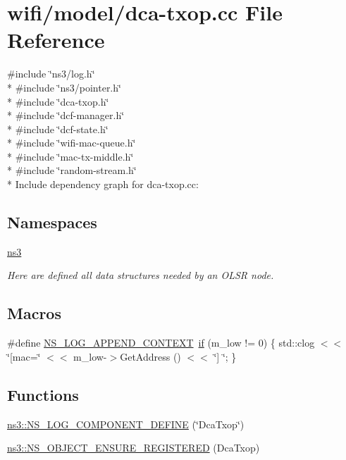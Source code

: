 \hypertarget{dca-txop_8cc}{}\section{wifi/model/dca-\/txop.cc File Reference}
\label{dca-txop_8cc}
{\ttfamily \#include \char`\"{}ns3/log.\+h\char`\"{}}\\*
{\ttfamily \#include \char`\"{}ns3/pointer.\+h\char`\"{}}\\*
{\ttfamily \#include \char`\"{}dca-\/txop.\+h\char`\"{}}\\*
{\ttfamily \#include \char`\"{}dcf-\/manager.\+h\char`\"{}}\\*
{\ttfamily \#include \char`\"{}dcf-\/state.\+h\char`\"{}}\\*
{\ttfamily \#include \char`\"{}wifi-\/mac-\/queue.\+h\char`\"{}}\\*
{\ttfamily \#include \char`\"{}mac-\/tx-\/middle.\+h\char`\"{}}\\*
{\ttfamily \#include \char`\"{}random-\/stream.\+h\char`\"{}}\\*
Include dependency graph for dca-\/txop.cc\+:
\subsection*{Namespaces}
\begin{DoxyCompactItemize}
\item 
 \hyperlink{namespacens3}{ns3}
\begin{DoxyCompactList}\small\item\em Here are defined all data structures needed by an O\+L\+SR node. \end{DoxyCompactList}\end{DoxyCompactItemize}
\subsection*{Macros}
\begin{DoxyCompactItemize}
\item 
\#define \hyperlink{dca-txop_8cc_abe50035652d407c40bdaef78214c4955}{N\+S\+\_\+\+L\+O\+G\+\_\+\+A\+P\+P\+E\+N\+D\+\_\+\+C\+O\+N\+T\+E\+XT}~\hyperlink{loss__OH__large__cities__urban_8m_ac77b6cfa3068152087725fe54b4ae8c8}{if} (m\+\_\+low != 0) \{ std\+::clog $<$$<$ \char`\"{}\mbox{[}mac=\char`\"{} $<$$<$ m\+\_\+low-\/$>$Get\+Address () $<$$<$ \char`\"{}\mbox{]} \char`\"{}; \}
\end{DoxyCompactItemize}
\subsection*{Functions}
\begin{DoxyCompactItemize}
\item 
\hyperlink{namespacens3_a1224af5fa4f77e4e19382584ea4edd55}{ns3\+::\+N\+S\+\_\+\+L\+O\+G\+\_\+\+C\+O\+M\+P\+O\+N\+E\+N\+T\+\_\+\+D\+E\+F\+I\+NE} (\char`\"{}Dca\+Txop\char`\"{})
\item 
\hyperlink{namespacens3_a34a15ec203ba0fd53175c0cc42a4a2ba}{ns3\+::\+N\+S\+\_\+\+O\+B\+J\+E\+C\+T\+\_\+\+E\+N\+S\+U\+R\+E\+\_\+\+R\+E\+G\+I\+S\+T\+E\+R\+ED} (Dca\+Txop)
\end{DoxyCompactItemize}


